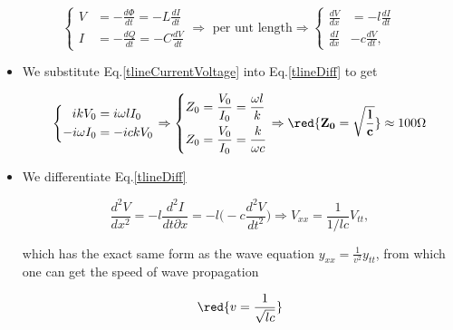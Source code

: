  \begin{equation}
   \left\lbrace \begin{aligned}
       V & = -\frac{d\Phi}{dt} = -L\frac{dI}{dt}\\
       I & = -\frac{dQ}{dt} = -C\frac{dV}{dt}
     \end{aligned}\right.\Rightarrow \text{ per unt length}
   \Rightarrow
   \left\lbrace \begin{aligned}
       \frac{dV}{dx} & = - l\frac{dI}{dt}\\
       \frac{dI}{dx} & - c\frac{dV}{dt},
     \end{aligned}\right.
   \label{tlineDiff}
 \end{equation}

 \begin{itemize}
 \item     We    substitute     Eq.\eqref{tlineCurrentVoltage}    into
   Eq.\eqref{tlineDiff} to get

  \begin{equation}
    \left\lbrace \begin{aligned}
        ikV_0&=i\omega lI_0\\
        -i\omega I_0 & = -ickV_0
      \end{aligned}\right. \Rightarrow\left\lbrace \begin{aligned}
        Z_0&=\frac{V_0}{I_0} = \frac{\omega l }{k}\\
        Z_0&=\frac{V_0}{I_0} = \frac{k}{\omega c}\\
      \end{aligned}\right.  \Rightarrow \red{\mathbf{Z_0 =
        \sqrt{\frac{l}{c}}}}\approx
    100\Omega
  \end{equation}

\item We differentiate Eq.\eqref{tlineDiff}

  \begin{equation}
    \frac{d^2V}{dx^2} = -l\frac{d^2I}{dt\partial x} = -l\bigg(-c\frac{d^2V}{dt^2}\bigg) \Rightarrow V_{xx} = \frac{1}{1/lc}V_{tt},
  \end{equation}

  \noindent  which  has the  exact  same  form  as the  wave  equation
  $ y_{xx}=\frac{1}{v^2}y_{tt} $, from which  one can get the speed of
  wave propagation

  \begin{equation}
    \red{v=\frac{1}{\sqrt{lc}}}
  \end{equation}
\end{itemize}


